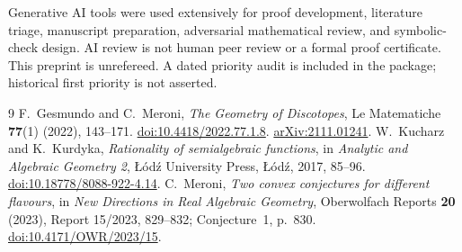 \documentclass[11pt]{article}
\begin{document}
Generative AI tools were used extensively for proof development,
literature triage, manuscript preparation, adversarial mathematical
review, and symbolic-check design. AI review is not human peer review
or a formal proof certificate. This preprint is unrefereed. A dated
priority audit is included in the package; historical first priority
is not asserted.

\begin{thebibliography}{9}
F.~Gesmundo and C.~Meroni, \emph{The Geometry of Discotopes},
Le Matematiche \textbf{77}(1) (2022), 143--171.
\href{https://doi.org/10.4418/2022.77.1.8}{doi:10.4418/2022.77.1.8}.
\href{https://arxiv.org/abs/2111.01241}{arXiv:2111.01241}.
W.~Kucharz and K.~Kurdyka, \emph{Rationality of semialgebraic functions},
in \emph{Analytic and Algebraic Geometry 2},
Łódź University Press, Łódź, 2017, 85--96.
\href{https://doi.org/10.18778/8088-922-4.14}{doi:10.18778/8088-922-4.14}.
C.~Meroni, \emph{Two convex conjectures for different flavours},
in \emph{New Directions in Real Algebraic Geometry},
Oberwolfach Reports \textbf{20} (2023), Report 15/2023, 829--832;
Conjecture~1, p.~830.
\href{https://doi.org/10.4171/OWR/2023/15}{doi:10.4171/OWR/2023/15}.
\end{thebibliography}
\end{document}

